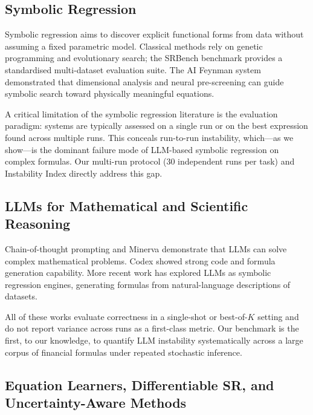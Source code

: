 \documentclass[twoside,11pt]{article}
\begin{document}
\subsection{Symbolic Regression}\label{subsec:symbolic-regression}
\label{sec:related_sr}

Symbolic regression aims to discover explicit functional forms from data without
assuming a fixed parametric model.  Classical methods rely on genetic programming
\citep{koza1992genetic} and evolutionary search; the SRBench benchmark \citep{lacava2021contemporary}
provides a standardised multi-dataset evaluation suite.  The AI Feynman
system \citep{udrescu2020ai} demonstrated that dimensional analysis and neural
pre-screening can guide symbolic search toward physically meaningful equations.

A critical limitation of the symbolic regression literature is the evaluation
paradigm: systems are typically assessed on a single run or on the best expression
found across multiple runs.  This conceals run-to-run instability, which---as we
show---is the dominant failure mode of LLM-based symbolic regression on complex
formulas.  Our multi-run protocol (30 independent runs per task) and Instability
Index directly address this gap.

\subsection{LLMs for Mathematical and Scientific Reasoning}\label{subsec:llms-for-mathematical-and-scientific-rea}
\label{sec:related_llm}

Chain-of-thought prompting \citep{wei2022chain} and Minerva \citep{lewkowycz2022minerva}
demonstrate that LLMs can solve complex mathematical problems.  Codex \citep{chen2021evaluating}
showed strong code and formula generation capability.  More recent work has explored
LLMs as symbolic regression engines, generating formulas from natural-language
descriptions of datasets.

All of these works evaluate correctness in a single-shot or best-of-$K$ setting and
do not report variance across runs as a first-class metric.  Our benchmark is the
first, to our knowledge, to quantify LLM instability systematically across a large
corpus of financial formulas under repeated stochastic inference.

\subsection{Equation Learners, Differentiable SR, and Uncertainty-Aware Methods}\label{subsec:equation-learners-differentiable-sr-and-}
\label{sec:related_eq}
\end{document}
